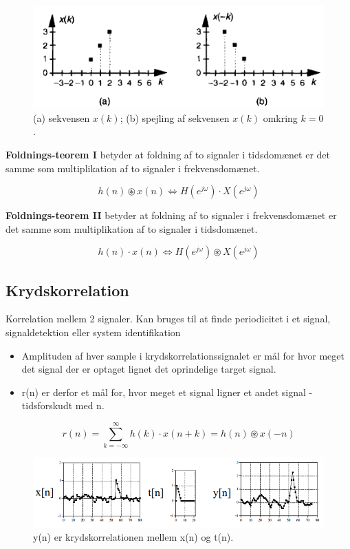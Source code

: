 \documentclass[danish]{article}
\begin{document}
\begin{figure}[H]
	\centering
	\includegraphics[width=0.6\linewidth]{graphics/convolution}
	\caption{(a) sekvensen $x(k)$; (b) spejling af sekvensen $x(k)$ omkring $k = 0$.}
	\label{fig:convolution}
\end{figure}

\textbf{Foldnings‐teorem I} betyder at foldning af to signaler i tidsdomænet er det samme som multiplikation af to signaler i frekvensdomænet.

\begin{equation}
h(n) \circledast x(n) \Leftrightarrow H(e^{j\omega}) \cdot X(e^{j\omega})
\end{equation}

\textbf{Foldnings-teorem II} betyder at foldning af to signaler i frekvensdomænet er det samme som multiplikation af to signaler i tidsdomænet. 

\begin{equation}
h(n) \cdot x(n) \Leftrightarrow H(e^{j\omega}) \circledast X(e^{j\omega})
\end{equation}

\subsection{Krydskorrelation}
Korrelation mellem 2 signaler.
Kan bruges til at finde periodicitet i et signal, signaldetektion eller system identifikation

\begin{itemize}
	\item Amplituden af hver sample i krydskorrelationssignalet er mål for hvor meget det signal der er optaget lignet det oprindelige target signal.
	\item r(n) er derfor et mål for, hvor meget et signal ligner et andet signal - tidsforskudt med n.
\end{itemize}
\begin{equation}
r(n) = \sum_{k=-\infty}^{\infty} h(k) \cdot x(n+k) = h(n) \circledast x(-n)
\end{equation}

\begin{figure}[H]
	\centering
	\includegraphics[width=0.8\linewidth]{graphics/crosscorrelation}
	\caption{y(n) er krydskorrelationen mellem x(n) og t(n).}
	\label{fig:crosscorrelation}
\end{figure}
\end{document}
